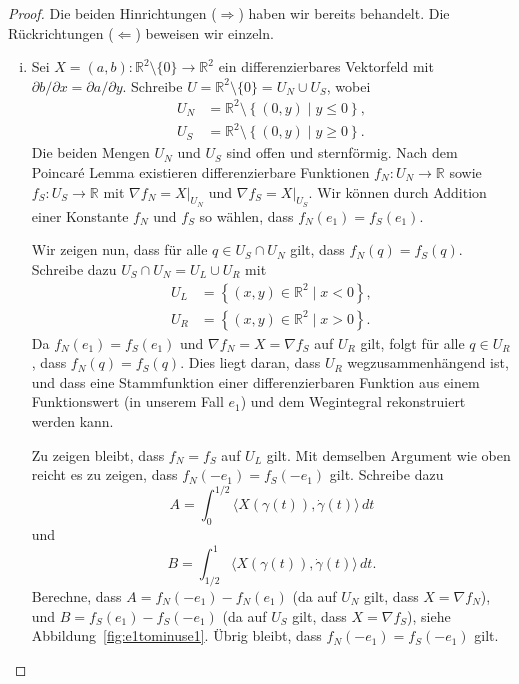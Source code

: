 \documentclass[../main.tex]{subfiles}
\begin{document}
\begin{proof}
  Die beiden Hinrichtungen ($\Rightarrow$) haben wir bereits behandelt.
  Die Rückrichtungen ($\Leftarrow$) beweisen wir einzeln.
  \begin{enumerate}[(i)]
    \item Sei $X = (a, b) \colon \mathbb{R}^2 \setminus \{0\} \to \mathbb{R}^2$
      ein differenzierbares Vektorfeld mit $\partial b / \partial x =
      \partial a / \partial y$.
      Schreibe $U = \mathbb{R}^2 \setminus \{0\} = U_N \cup U_S$, wobei
      \begin{align*}
        U_N & = \mathbb{R}^2 \setminus \left\{(0, y) \mid y \leq 0\right\}, \\
        U_S & = \mathbb{R}^2  \setminus \left\{(0, y) \mid y \geq 0 \right\}.
      \end{align*}
      Die beiden Mengen $U_N$ und $U_S$ sind offen und sternförmig.
      Nach dem Poincaré Lemma existieren
      differenzierbare Funktionen $f_N \colon U_N \to \mathbb{R}$
      sowie $f_S \colon U_S \to \mathbb{R}$ mit
      $\nabla f_N = X|_{U_N}$ und $\nabla f_S = X|_{U_S}$.
      Wir können
      durch Addition einer Konstante
      $f_N$ und $f_S$ so wählen, dass
      $f_N(e_1) = f_S(e_1)$.

      Wir zeigen nun, dass für alle $q \in U_S \cap U_N$ gilt,
      dass $f_N(q) = f_S(q)$.
      Schreibe dazu $U_S \cap U_N = U_L \cup U_R$ mit
      \begin{align*}
        U_L & = \left\{(x, y) \in \mathbb{R}^2 \mid x < 0 \right\}, \\
        U_R &= \left\{(x, y) \in \mathbb{R}^2 \mid x > 0\right\}.
      \end{align*}
      Da $f_N(e_1) = f_S(e_1)$ und $\nabla f_N = X = \nabla f_S$
      auf $U_R$ gilt, folgt für alle $q \in U_R$, dass
      $f_N(q) = f_S(q)$.
      Dies liegt daran, dass $U_R$ wegzusammenhängend ist,
      und dass eine Stammfunktion einer differenzierbaren Funktion
      aus einem Funktionswert (in unserem Fall $e_1$)
      und dem Wegintegral rekonstruiert werden kann.

      Zu zeigen bleibt, dass $f_N = f_S$ auf $U_L$ gilt.
      Mit demselben Argument wie oben reicht es zu zeigen,
      dass $f_N(-e_1) = f_S(-e_1)$ gilt.
      Schreibe dazu
      \[
        A =
        \int_{0}^{1/2} \langle X(\gamma(t)), \dot \gamma(t) \rangle \, dt
      \]
      und
      \[
        B =
        \int_{1/2}^{1} \langle X(\gamma(t)), \dot \gamma(t) \rangle \, dt.
      \]
      Berechne, dass
      \(
        A = f_N(-e_1) - f_N(e_1)
      \)
      (da auf $U_N$ gilt,
      dass $X = \nabla f_N$),
      und $B = f_S(e_1) - f_S(-e_1)$
      (da auf $U_S$ gilt, dass $X =
      \nabla f_S$),
      siehe Abbildung~\ref{fig:e1tominuse1}.
      Übrig bleibt, dass
      $f_N(-e_1) = f_S(-e_1)$ gilt.


\end{enumerate}
\end{proof}
\end{document}
